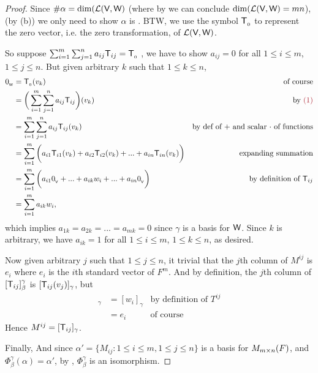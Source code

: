 \begin{proof}
Since \(\#\alpha = \dim(\mathcal{L}(\textsf{V}, \textsf{W})\) (where by  we can conclude \(\dim(\mathcal{L}(\textsf{V}, \textsf{W}) = mn\)), (by (b)) we only need to show \(\alpha\) is \LID{}.
BTW, we use the symbol \(\textsf{T}_{_0}\) to represent the zero vector, i.e. the zero transformation, of \(\mathcal{L}(\textsf{V}, \textsf{W})\).

So suppose \(\sum_{i = 1}^{m} \sum_{j = 1}^n a_{ij} \textsf{T}_{ij} = \textsf{T}_{_0}\) , we have to show \(a_{ij} = 0\) for all \(1 \le i \le m\), \(1 \le j \le n\).
But given arbitrary \(k\) such that \(1 \le k \le n\),
\begin{align*}
    \OW & = \TZERO(v_k) & \text{of course} \\
        & = \bigg( \sum_{i = 1}^{m} \sum_{j = 1}^n a_{ij} \T_{ij} \bigg) (v_k) & \text{by \MAROON{(1)}} \\
        & = \sum_{i = 1}^{m} \sum_{j = 1}^n a_{ij} \T_{ij} (v_k) & \text{by def of \(+\) and scalar \(\cdot\) of functions} \\
        & = \sum_{i = 1}^{m} \bigg( a_{i1} \T_{i1} (v_k) + a_{i2} \T_{i2} (v_k) + ... + a_{in} \T_{in} (v_k) \bigg) & \text{expanding summation} \\
        & = \sum_{i = 1}^{m} \bigg( a_{i1} \OV + ... + a_{ik} w_i + ... + a_{in} \OV \bigg) & \text{by definition of \(\T_{ij}\)} \\
        & = \sum_{i = 1}^m a_{ik} w_i,
\end{align*}
which implies \(a_{1k} = a_{2k} = ... = a_{mk} = 0\) since \(\gamma\) is a basis for \(\textsf{W}\).
Since \(k\) is arbitrary, we have \(a_{ik} = 1\) for all \(1 \le i \le m\), \(1 \le k \le n\), as desired.

Now given arbitrary \(j\) such that \(1 \le j \le n\), it trivial that the \(j\)th column of \(M^{ij}\) is \(e_i\) where \(e_i\) is the \(i\)th standard vector of \(F^m\).
And by definition, the \(j\)th column of \([\textsf{T}_{ij}]_{\beta}^{\gamma}\) is \([\textsf{T}_{ij}(v_j)]_{\gamma}\), but
\begin{align*}
    [\T_{ij}(v_j)]_{\gamma} & = [w_i]_{\gamma} & \text{by definition of \(T^{ij}\)} \\
                 & = e_i & \text{of course}
\end{align*}
Hence \(M^{ij} = [\textsf{T}_{ij}]_{\gamma}\).

Finally, And since \(\alpha' = \{ M_{ij} : 1 \le i \le m, 1 \le j \le n \}\) is a basis for \(M_{m \times n}(F)\), and \(\Phi_{\beta}^{\gamma}(\alpha) = \alpha'\), by , \(\Phi_{\beta}^{\gamma}\) is an isomorphism.
\end{proof}

